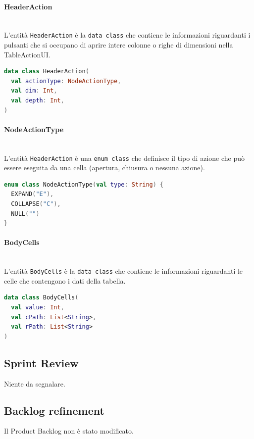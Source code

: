\paragraph*{HeaderAction} \mbox{} \\
L'entità \verb|HeaderAction| è la \verb|data class| che contiene le informazioni riguardanti i pulsanti che si occupano di aprire intere colonne o righe di dimensioni nella TableActionUI.
\begin{lstlisting}[caption={HeaderAction}, label={lst:headeraction}, language=Kotlin]
data class HeaderAction(
  val actionType: NodeActionType,
  val dim: Int,
  val depth: Int,
)
\end{lstlisting}

\paragraph*{NodeActionType} \mbox{} \\
L'entità \verb|HeaderAction| è una \verb|enum class| che definisce il tipo di azione che può essere eseguita da una cella (apertura, chiusura o nessuna azione).
\begin{lstlisting}[caption={NodeActionType}, label={lst:nodeactiontype}, language=Kotlin]
enum class NodeActionType(val type: String) {
  EXPAND("E"),
  COLLAPSE("C"),
  NULL("")
}
\end{lstlisting}

\paragraph*{BodyCells} \mbox{} \\
L'entità \verb|BodyCells| è la \verb|data class| che contiene le informazioni riguardanti le celle che contengono i dati della tabella.
\begin{lstlisting}[caption={BodyCells}, label={lst:bodycells}, language=Kotlin]
data class BodyCells(
  val value: Int,
  val cPath: List<String>,
  val rPath: List<String>
)
\end{lstlisting}

\subsection{Sprint Review}
Niente da segnalare.

\subsection{Backlog refinement}
Il Product Backlog non è stato modificato.

